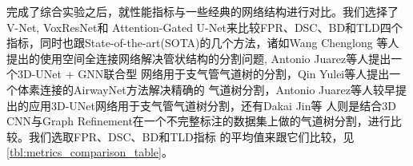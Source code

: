 完成了综合实验之后，就性能指标与一些经典的网络结构进行对比。我们选择了V-Net\cite{Milletar2016VNetFC}, VoxResNet\cite{CHEN2018446}和
Attention-Gated U-Net\cite{Oktay2018AttentionUL}来比较FPR、DSC、BD和TLD四个指标，同时也跟State-of-the-art(SOTA)的几个方法，诸如Wang Chenglong
等人\cite{Wang2019TubularSegment}提出的使用空间全连接网络解决管状结构的分割问题, Antonio Juarez等人提出一个3D-UNet + GNN联合型
网络\cite{Juarez2019Joint3DUNetGraph}用于支气管气道树的分割，Qin Yulei等人\cite{Qin2019AirwayNet}提出一个体素连接的AirwayNet方法解决精确的
气道树分割，Antonio Juarez等人\cite{Juarez2018AutoAirwaySegment}较早提出的应用3D-UNet网络用于支气管气道树分割，还有Dakai Jin等
人\cite{Dakai2017GraphRefinement}则是结合3D CNN与Graph Refinement在一个不完整标注的数据集上做的气道树分割，进行比较。我们选取FPR、DSC、BD和TLD指标
的平均值来跟它们比较，见\autoref{tbl:metrics_comparison_table}。
